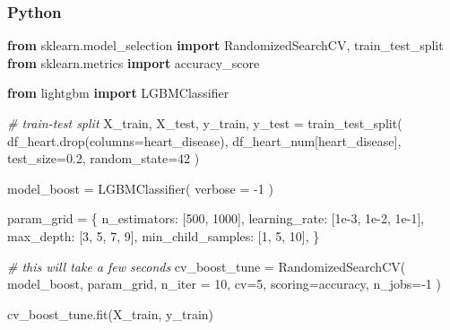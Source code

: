 \documentclass[
  letterpaper,
]{krantz}
\newenvironment{Shaded}{}{}
\newcommand{\CommentTok}[1]{\textcolor[rgb]{0.38,0.63,0.69}{\textit{#1}}}
\newcommand{\DecValTok}[1]{\textcolor[rgb]{0.25,0.63,0.44}{#1}}
\newcommand{\FloatTok}[1]{\textcolor[rgb]{0.25,0.63,0.44}{#1}}
\newcommand{\ImportTok}[1]{\textcolor[rgb]{0.00,0.50,0.00}{\textbf{#1}}}
\newcommand{\NormalTok}[1]{#1}
\newcommand{\OperatorTok}[1]{\textcolor[rgb]{0.40,0.40,0.40}{#1}}
\newcommand{\StringTok}[1]{\textcolor[rgb]{0.25,0.44,0.63}{#1}}
\begin{document}
\subsubsection{Python}

\begin{Shaded}
\begin{Highlighting}[]
\ImportTok{from}\NormalTok{ sklearn.model\_selection }\ImportTok{import}\NormalTok{ RandomizedSearchCV, train\_test\_split}
\ImportTok{from}\NormalTok{ sklearn.metrics }\ImportTok{import}\NormalTok{ accuracy\_score}

\ImportTok{from}\NormalTok{ lightgbm }\ImportTok{import}\NormalTok{ LGBMClassifier}

\CommentTok{\# train{-}test split}
\NormalTok{X\_train, X\_test, y\_train, y\_test }\OperatorTok{=}\NormalTok{ train\_test\_split(}
\NormalTok{    df\_heart.drop(columns}\OperatorTok{=}\StringTok{\textquotesingle{}heart\_disease\textquotesingle{}}\NormalTok{), }
\NormalTok{    df\_heart\_num[}\StringTok{\textquotesingle{}heart\_disease\textquotesingle{}}\NormalTok{],}
\NormalTok{    test\_size}\OperatorTok{=}\FloatTok{0.2}\NormalTok{,}
\NormalTok{    random\_state}\OperatorTok{=}\DecValTok{42}
\NormalTok{)}

\NormalTok{model\_boost }\OperatorTok{=}\NormalTok{ LGBMClassifier(}
\NormalTok{    verbose }\OperatorTok{=} \OperatorTok{{-}}\DecValTok{1}
\NormalTok{)}

\NormalTok{param\_grid }\OperatorTok{=}\NormalTok{ \{}
    \StringTok{\textquotesingle{}n\_estimators\textquotesingle{}}\NormalTok{: [}\DecValTok{500}\NormalTok{, }\DecValTok{1000}\NormalTok{],}
    \StringTok{\textquotesingle{}learning\_rate\textquotesingle{}}\NormalTok{: [}\FloatTok{1e{-}3}\NormalTok{, }\FloatTok{1e{-}2}\NormalTok{, }\FloatTok{1e{-}1}\NormalTok{],}
    \StringTok{\textquotesingle{}max\_depth\textquotesingle{}}\NormalTok{: [}\DecValTok{3}\NormalTok{, }\DecValTok{5}\NormalTok{, }\DecValTok{7}\NormalTok{, }\DecValTok{9}\NormalTok{],}
    \StringTok{\textquotesingle{}min\_child\_samples\textquotesingle{}}\NormalTok{: [}\DecValTok{1}\NormalTok{, }\DecValTok{5}\NormalTok{, }\DecValTok{10}\NormalTok{],}
\NormalTok{\}}

\CommentTok{\# this will take a few seconds}
\NormalTok{cv\_boost\_tune }\OperatorTok{=}\NormalTok{ RandomizedSearchCV(}
\NormalTok{    model\_boost, }
\NormalTok{    param\_grid, }
\NormalTok{    n\_iter }\OperatorTok{=} \DecValTok{10}\NormalTok{,}
\NormalTok{    cv}\OperatorTok{=}\DecValTok{5}\NormalTok{, }
\NormalTok{    scoring}\OperatorTok{=}\StringTok{\textquotesingle{}accuracy\textquotesingle{}}\NormalTok{, }
\NormalTok{    n\_jobs}\OperatorTok{={-}}\DecValTok{1}
\NormalTok{)}

\NormalTok{cv\_boost\_tune.fit(X\_train, y\_train)}
\end{Highlighting}
\end{Shaded}
\end{document}
